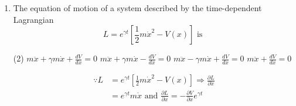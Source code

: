 \begin{enumerate}
\begin{answer}
	\begin{figure}[H]
		\centering
		\texttt{[image: diagram-20210926(19)-crop]}
	\end{figure}
	\begin{align*}
	\intertext{The lagrangian of system is given by}
	L&=\frac{1}{2} m \dot{x}^{2}-V(x)
	\intertext{The potential energy is given by}
	V(x)&=\frac{k}{2}\left[\left(x^{2}+l^{2}\right)^{\frac{1}{2}}-l\right]^{2}+\frac{k}{2}\left[\left(x^{2}+l^{2}\right)^{\frac{1}{2}}-l\right]^{2}\\
	V(x)&=k\left[\left(x^{2}+l^{2}\right)^{\frac{1}{2}}-l\right]^{2}
	\intertext{For small oscillation one can approximate potential by Taylor expansion}
	V(x)&=k l^{2}\left[\left(1+\frac{x^{2}}{l^{2}}\right)^{\frac{1}{2}}-1\right]^{2} \Rightarrow V(x)\\&=k l^{2}\left[\left(1+\frac{1}{2} \frac{x^{2}}{l^{2}}-\frac{1}{8} \frac{x^{4}}{l^{4}}\right)-1\right]^{2}\\
	V(x)&=\frac{k l^{2}}{4}\left(\frac{x^{2}}{l^{2}}\right)^{2} \Rightarrow V(x)=k\left(\frac{x^{4}}{4 l^{2}}\right)\\
	\text{So Lagrangian of system is given by }L&=\frac{1}{2} m \dot{x}^{2}-k\left(\frac{x^{4}}{4 l^{2}}\right)\\
	\text{The Lagranges equation of motion }&\frac{d}{d t}\left(\frac{\partial L}{\partial \dot{x}}\right)-\left(\frac{\partial L}{\partial x}\right)=0 \Rightarrow m \ddot{x}+\frac{k x^{3}}{l^{2}}=0
	\end{align*}
	So the correct answer is \textbf{Option (A)}
\end{answer}
	\item The equation of motion of a system described by the time-dependent Lagrangian
	$$
	L=e^{\gamma t}\left[\frac{1}{2} m \dot{x}^{2}-V(x)\right] \text { is }
	$$
	{}
	\begin{tasks}(2)
		\task[\textbf{A.}] $m \ddot{x}+\gamma m \dot{x}+\frac{d V}{d x}=0$
		\task[\textbf{B.}] $m \ddot{x}+\gamma m \dot{x}-\frac{d V}{d x}=0$
		\task[\textbf{C.}]  $m \ddot{x}-\gamma m \dot{x}+\frac{d V}{d x}=0$
		\task[\textbf{D.}] $m \ddot{x}+\frac{d V}{d x}=0$
	\end{tasks}
\begin{answer}
	\begin{align*}
	\because L&=e^{\gamma t}\left[\frac{1}{2} m \dot{x}^{2}-V(x)\right] \Rightarrow \frac{\partial L}{\partial \dot{x}}\\&=e^{\gamma t} m \dot{x}\text{ and }\frac{\partial L}{\partial x}=-\frac{\partial V}{\partial x} e^{\gamma t}\\

\end{align*}
\end{answer}
\end{enumerate}
